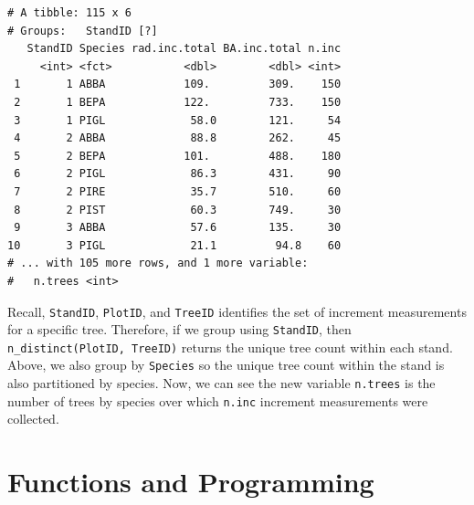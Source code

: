 \documentclass[]{krantz}
\makeatletter
\newenvironment{Shaded}{\begin{snugshade}}{\end{snugshade}}
\newcommand{\KeywordTok}[1]{\textcolor[rgb]{0.27,0.27,0.27}{\textbf{#1}}}
\newcommand{\DataTypeTok}[1]{\textcolor[rgb]{0.27,0.27,0.27}{#1}}
\newcommand{\StringTok}[1]{\textcolor[rgb]{0.5,0.5,0.5}{#1}}
\newcommand{\OperatorTok}[1]{\textcolor[rgb]{0.43,0.43,0.43}{\textbf{#1}}}
\newcommand{\NormalTok}[1]{#1}
\newenvironment{kframe}{%
\medskip{}
\setlength{\fboxsep}{.8em}
 \def\at@end@of@kframe{}%
 \ifinner\ifhmode%
  \def\at@end@of@kframe{\end{minipage}}%
  \begin{minipage}{\columnwidth}%
 \fi\fi%
 \def\FrameCommand##1{\hskip\@totalleftmargin \hskip-\fboxsep
 \colorbox{shadecolor}{##1}\hskip-\fboxsep
     \hskip-\linewidth \hskip-\@totalleftmargin \hskip\columnwidth}%
 \MakeFramed {\advance\hsize-\width
   \@totalleftmargin\z@ \linewidth\hsize
   \@setminipage}}%
 {\par\unskip\endMakeFramed%
 \at@end@of@kframe}
\renewenvironment{Shaded}{\begin{kframe}}{\end{kframe}}
\theoremstyle{definition}
\theoremstyle{definition}
\theoremstyle{definition}
\theoremstyle{remark}
\makeatother
\begin{document}
\begin{Shaded}
\end{Shaded}

\begin{verbatim}
# A tibble: 115 x 6
# Groups:   StandID [?]
   StandID Species rad.inc.total BA.inc.total n.inc
     <int> <fct>           <dbl>        <dbl> <int>
 1       1 ABBA            109.         309.    150
 2       1 BEPA            122.         733.    150
 3       1 PIGL             58.0        121.     54
 4       2 ABBA             88.8        262.     45
 5       2 BEPA            101.         488.    180
 6       2 PIGL             86.3        431.     90
 7       2 PIRE             35.7        510.     60
 8       2 PIST             60.3        749.     30
 9       3 ABBA             57.6        135.     30
10       3 PIGL             21.1         94.8    60
# ... with 105 more rows, and 1 more variable:
#   n.trees <int>
\end{verbatim}

Recall, \texttt{StandID}, \texttt{PlotID}, and \texttt{TreeID}
identifies the set of increment measurements for a specific tree.
Therefore, if we group using \texttt{StandID}, then
\texttt{n\_distinct(PlotID,\ TreeID)} returns the unique tree count
within each stand. Above, we also group by \texttt{Species} so the
unique tree count within the stand is also partitioned by species. Now,
we can see the new variable \texttt{n.trees} is the number of trees by
species over which \texttt{n.inc} increment measurements were collected.

\chapter{Functions and Programming}\label{functions-and-programming}
\end{document}
